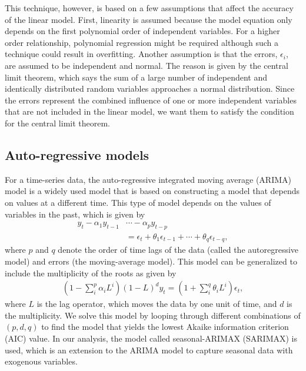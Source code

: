 \documentclass[prl,aps,superscriptaddress,twocolumn,10pt,nolongbibliography]{revtex4-2}
\begin{document}
This technique, however, is based on a few assumptions that affect the accuracy of the linear model. 
First, linearity is assumed because the model equation only depends on the first polynomial order of independent variables. 
For a higher order relationship, polynomial regression might be required although such a technique could result in overfitting. 
Another assumption is that the errors, $\epsilon_i$, are assumed to be independent and normal. 
The reason is given by the central limit theorem, which says the sum of a large number of independent and identically distributed random variables approaches a normal distribution. 
Since the errors represent the combined influence of one or more independent variables that are not included in the linear model, we want them to satisfy the condition for the central limit theorem. 

\subsection{Auto-regressive models}
For a time-series data, the auto-regressive integrated moving average (ARIMA) model is a widely used model that is based on constructing a model that depends on values at a different time. 
This type of model depends on the values of variables in the past, which is given by 
\begin{align}
y_t - \alpha_1 y_{t-1} &\cdots - \alpha_p y_{t-p} \nonumber \\
&= \epsilon_t + \theta_1 \epsilon_{t-1} + \cdots + \theta_q \epsilon_{t-q},
\end{align}
where $p$ and $q$ denote the order of time lags of the data (called the autoregressive model) and errors (the moving-average model). 
This model can be generalized to include the multiplicity of the roots as given by 
\begin{align}
(1 - \sum_i^p \alpha_i L^i) (1 - L)^d y_t = (1 + \sum_i^q \theta_i L^i) \epsilon_t, \label{eq:arima}
\end{align}
where $L$ is the lag operator, which moves the data by one unit of time, and $d$ is the multiplicity. 
We solve this model by looping through different combinations of $(p, d, q)$ to find the model that yields the lowest Akaike information criterion (AIC) value. 
In our analysis, the model called seasonal-ARIMAX (SARIMAX) is used, which is an extension to the ARIMA model to capture seasonal data with exogenous variables.
\end{document}

